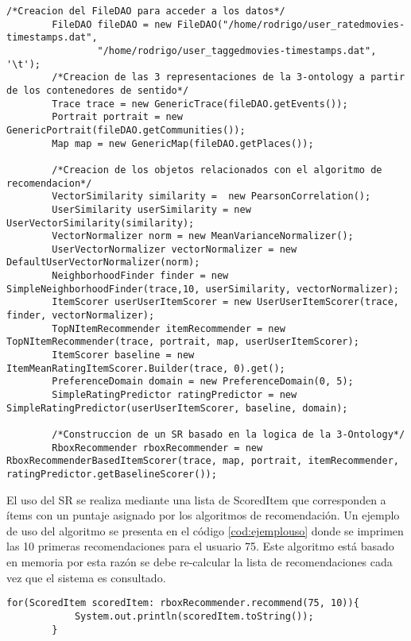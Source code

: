 \begin{lstlisting}[float, caption = SR \textit{knn-user/user}, label = cod:srknn]
		/*Creacion del FileDAO para acceder a los datos*/
		FileDAO fileDAO = new FileDAO("/home/rodrigo/user_ratedmovies-timestamps.dat", 
				"/home/rodrigo/user_taggedmovies-timestamps.dat", '\t');
		/*Creacion de las 3 representaciones de la 3-ontology a partir de los contenedores de sentido*/
		Trace trace = new GenericTrace(fileDAO.getEvents());
		Portrait portrait = new GenericPortrait(fileDAO.getCommunities());
		Map map = new GenericMap(fileDAO.getPlaces());
		
		/*Creacion de los objetos relacionados con el algoritmo de recomendacion*/
		VectorSimilarity similarity =  new PearsonCorrelation();
		UserSimilarity userSimilarity = new UserVectorSimilarity(similarity);
		VectorNormalizer norm = new MeanVarianceNormalizer();
		UserVectorNormalizer vectorNormalizer = new DefaultUserVectorNormalizer(norm);
		NeighborhoodFinder finder = new SimpleNeighborhoodFinder(trace,10, userSimilarity, vectorNormalizer);
		ItemScorer userUserItemScorer = new UserUserItemScorer(trace, finder, vectorNormalizer);
		TopNItemRecommender itemRecommender = new TopNItemRecommender(trace, portrait, map, userUserItemScorer);
		ItemScorer baseline = new ItemMeanRatingItemScorer.Builder(trace, 0).get();
		PreferenceDomain domain = new PreferenceDomain(0, 5);
		SimpleRatingPredictor ratingPredictor = new SimpleRatingPredictor(userUserItemScorer, baseline, domain);
		
		/*Construccion de un SR basado en la logica de la 3-Ontology*/
		RboxRecommender rboxRecommender = new RboxRecommenderBasedItemScorer(trace, map, portrait, itemRecommender, ratingPredictor.getBaselineScorer());
\end{lstlisting}

El uso del SR se realiza mediante una lista de ScoredItem que corresponden a ítems con un puntaje asignado por los algoritmos de recomendación. Un ejemplo de uso del algoritmo se presenta en el código \ref{cod:ejemplouso} donde se imprimen las 10 primeras recomendaciones para el usuario 75. Este algoritmo está basado en memoria por esta razón se debe re-calcular la lista de recomendaciones cada vez que el sistema es consultado.

\begin{lstlisting}[float, caption = Ejemplo de uso, label = cod:ejemplouso]
for(ScoredItem scoredItem: rboxRecommender.recommend(75, 10)){
			System.out.println(scoredItem.toString());
		}
\end{lstlisting}

